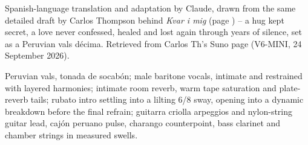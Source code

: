 
\begin{notes}
Spanish-language translation and adaptation by Claude, drawn from the same detailed draft by Carlos Thompson behind \emph{Kvar i mig} (page \pageref{sec:kvar-i-mig}) -- a hug kept secret, a love never confessed, healed and lost again through years of silence, set as a Peruvian vals décima. Retrieved from Carlos Th's Suno page (V6-MINI, 24 September 2026).
\end{notes}
\begin{style}
Peruvian vals, tonada de socabón; male baritone vocals, intimate and restrained with layered harmonies; intimate room reverb, warm tape saturation and plate-reverb tails; rubato intro settling into a lilting 6/8 sway, opening into a dynamic breakdown before the final refrain; guitarra criolla arpeggios and nylon-string guitar lead, cajón peruano pulse, charango counterpoint, bass clarinet and chamber strings in measured swells.
\end{style}
